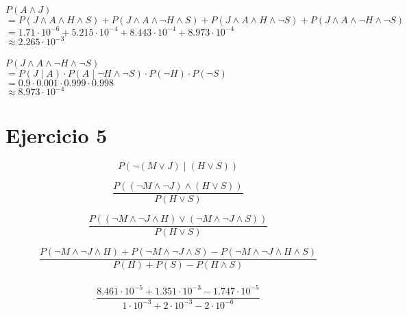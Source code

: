 \documentclass {article}
\begin{document}
$P (A \land J)$\\
	\indent $
		= P(J \land A \land H \land S)
		+ P(J \land A \land \neg H \land S)
		+ P(J \land A \land H \land \neg S)
		+ P(J \land A \land \neg H \land \neg S)
	 $\\
 	\indent $
		= 1.71 \cdot 10^{-6}
		+ 5.215 \cdot 10^{-4}
		+ 8.443 \cdot 10^{-4}
		+ 8.973 \cdot 10^{-4}
	 $\\
	 \indent $
	 	\approx 2.265 \cdot 10^{-3}
	 $\\
\\
$P (J \land A \land \neg H \land \neg S)$\\
	\indent $
		= P (J \mid A)
		\cdot P (A \mid \neg H \land \neg S)
		\cdot P (\neg H)
		\cdot P (\neg S)$\\
	\indent $
		= 0.9
		\cdot 0.001
		\cdot 0.999
		\cdot 0.998
		$\\
	\indent $
		\approx 8.973 \cdot 10^{-4}$

\clearpage
\section {Ejercicio 5}
$$P ( \neg(M \lor J) \mid (H \lor S))$$

$$\frac
	{P (( \neg M \land \neg J) \land (H \lor S))}
	{P(H \lor S)}$$

$$\frac
	{P (( \neg M \land \neg J \land H) \lor (\neg M \land \neg J \land S))}
	{P(H \lor S)}$$

$$\frac
	{P ( \neg M \land \neg J \land H) + P (\neg M \land \neg J \land S) - P(\neg M \land \neg J \land H \land S)}
	{P (H) + P (S) -P (H \land S)}$$
\\

$$\frac
	{8.461 \cdot 10^{-5} + 1.351 \cdot 10^{-3} - 1.747 \cdot 10^{-5}}
	{1 \cdot 10^{-3} + 2 \cdot 10^{-3} - 2 \cdot 10^{-6}}$$
\\
\end{document}
